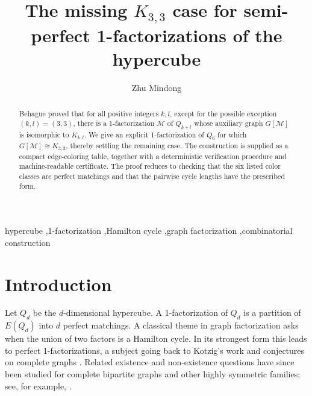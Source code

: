 \documentclass[preprint,12pt]{elsarticle}
\newcommand{\M}{\mathcal M}
\begin{document}
\begin{frontmatter}

\title{The missing \texorpdfstring{\(K_{3,3}\)}{K3,3} case for semi-perfect 1-factorizations of the hypercube}

\author[aff1]{Zhu Mindong}


\begin{abstract}
Behague proved that for all positive integers \(k,l\), except for the possible
exception \((k,l)=(3,3)\), there is a 1-factorization \(\M\) of \(Q_{k+l}\)
whose auxiliary graph \(G[\M]\) is isomorphic to \(K_{k,l}\). We give an
explicit 1-factorization of \(Q_6\) for which \(G[\M]\cong K_{3,3}\), thereby
settling the remaining case. The construction is supplied as a compact
edge-coloring table, together with a deterministic verification procedure and
machine-readable certificate. The proof reduces to checking that the six
listed color classes are perfect matchings and that the pairwise cycle lengths
have the prescribed form.
\end{abstract}

\begin{keyword}
hypercube \sep 1-factorization \sep Hamilton cycle \sep graph factorization
\sep combinatorial construction
\end{keyword}

\end{frontmatter}

\section{Introduction}

Let \(Q_d\) be the \(d\)-dimensional hypercube. A 1-factorization of \(Q_d\)
is a partition of \(E(Q_d)\) into \(d\) perfect matchings. A classical theme
in graph factorization asks when the union of two factors is a Hamilton cycle.
In its strongest form this leads to perfect 1-factorizations, a subject going
back to Kotzig's work and conjectures on complete graphs
\cite{kotzig,anderson}. Related existence and non-existence questions have
since been studied for complete bipartite graphs and other highly symmetric
families; see, for example, \cite{laufer,bryant_maenhaut_wanless}.
\end{document}
